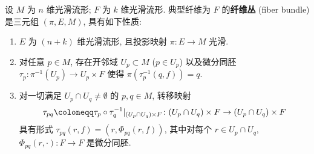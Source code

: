 \begin{definition}[纤维丛]\label{def:5.6}
设 $M$ 为 $n$ 维光滑流形; $F$ 为 $k$ 维光滑流形. 典型纤维为 $F$ 的\textbf{纤维丛} (fiber bundle) 是三元组 $(\pi, E, M)$, 具有如下性质:
\begin{enumerate}
    \item $E$ 为 $(n+k)$ 维光滑流形, 且投影映射 $\pi \colon E \to M$ 光滑.
    \item 对任意 $p \in M$, 存在开邻域 $U_p \subset M$ ($p \in U_p$) 以及微分同胚 $\tau_p \colon \pi^{-1}(U_p) \to U_p \times F$ 使得 $\pi(\tau_p^{-1}(q, f)) = q$.
    \item 对一切满足 $U_p \cap U_q \neq \emptyset$ 的 $p, q \in M$, 转移映射
    \begin{equation}\label{eq:5.21}
        \tau_{pq} \defeq \tau_p \circ \tau_q^{-1}|_{(U_p \cap U_q) \times F} \colon (U_p \cap U_q) \times F \to (U_p \cap U_q) \times F
    \end{equation}
    具有形式 $\tau_{pq}(r, f) = (r, \Phi_{pq}(r, f))$, 其中对每个 $r \in U_p \cap U_q$, $\Phi_{pq}(r, \cdot) \colon F \to F$ 是微分同胚.
\end{enumerate}
\end{definition}

